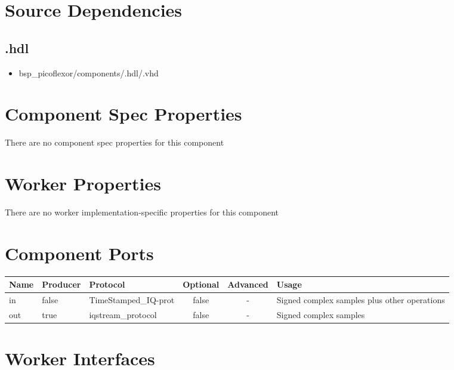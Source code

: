\section*{Source Dependencies}
\subsection*{\comp.hdl}
\begin{itemize}
	\item bsp\_picoflexor/components/\comp.hdl/\comp.vhd
\end{itemize}

\begin{landscape}
	\section*{Component Spec Properties}
	There are no component spec properties for this component

	\section*{Worker Properties}
	There are no worker implementation-specific properties for this component

	\section*{Component Ports}
	\begin{scriptsize}
		\begin{tabular}{|M{2cm}|M{1.5cm}|M{4cm}|c|c|M{9cm}|}
			\hline
			Name & Producer & Protocol                       & Optional & Advanced & Usage                                  		\\
			\hline
			in   & false    & TimeStamped\_IQ-prot           & false    & -        & Signed complex samples plus other operations   \\
			\hline
			out  & true     & iqstream\_protocol			 & false    & -        & Signed complex samples 						\\
			\hline
		\end{tabular}
	\end{scriptsize}
	\section*{Worker Interfaces}

\end{landscape}
